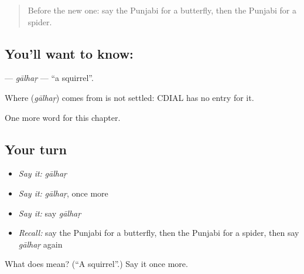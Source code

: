 \label{lesson:PA-C132-galhar}



\begin{quote}
Before the new one: say the Punjabi for a butterfly, then the Punjabi for a spider.
\end{quote}

\subsection*{You'll want to know: }
\textbf{} — \emph{gālhaṛ} — \textquotedblleft{}a squirrel\textquotedblright{}.

\begin{cousinweb}
Where \textbf{} (\emph{gālhaṛ}) comes from is not settled: CDIAL has no entry for it.
\end{cousinweb}

\begin{grammarlens}[title={What you've built}]
One more word for this chapter.
\end{grammarlens}

\subsection*{Your turn}
\begin{itemize}
\raggedright
  \item \emph{Say it:} \emph{gālhaṛ}
  \item \emph{Say it:} \emph{gālhaṛ}, once more
  \item \emph{Say it:} say \emph{gālhaṛ}
  \item \emph{Recall:} say the Punjabi for a butterfly, then the Punjabi for a spider, then say \emph{gālhaṛ} again
\end{itemize}

\begin{tcolorbox}[breakable,colback=teal!4,colframe=teal!35!black,title={Before you move on}]
What does  mean? (\textquotedblleft{}A squirrel\textquotedblright{}.) Say it once more.
\end{tcolorbox}
